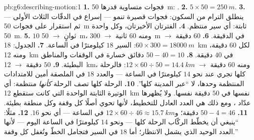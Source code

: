 \begin{solution}{pb:g6:describing-motion:1}
\textbf{1.} فجوات متساوية قدرها \qty{50}{m}: .
\textbf{2.} $5 \times 50 = \qty{250}{m}$.
\textbf{3.} ينطلق الترام من السكون: فجوات قصيرة تنمو ---
إسراع في الدقّات الثلاث الأولى --- ثم استقرار على فجوات
\qty{50}{m} ثابتة: أي سير منتظم.
\textbf{4.} الفترتان الأخيرتان، وكل واحدة \qty{50}{m}.
\textbf{5.} $10$ ثوانٍ $\to$ \qty{50}{m}، ومنه $60$ ثانية $\to$
\qty{300}{m} في الدقيقة.
\textbf{6.} $60$ دقيقة $\to$ $60 \times 300 = \qty{18000}{m}$:
 السير $18$ كيلومترًا في الساعة.
\textbf{7.} الجدول: \qty{18}{km} لكل $60$ دقيقة، ومنه \qty{12}{km}
في $40$ دقيقة.
\textbf{8.} $50 - 40 = 10$ دقائق خسارة في الوقفات والمناطق
البطيئة.
\textbf{9.} $50$ دقيقة $\to$ \qty{12}{km}، ومنه $60$ دقيقة $\to$
$12 \times 60 \div 50 = \qty{14.4}{km}$: فالرحلة كلها تجري عند
نحو $14$ كيلومترًا في الساعة --- والعدد $18$ في الملصقة أمين
للامتدادات المنتظمة وحدها، لا ``عبر المدينة كلها''.
\textbf{10.}  الرحلة كلها تصف الرحلة \emph{كأنها} منتظمة:
أي الوتيرة الثابتة الواحدة التي كانت ستقطع \qty{12}{km} نفسها في
$50$ دقيقة نفسها. ولا يُظهرها عدّاد ، ومع ذلك هي العدد
العادل للتخطيط، لأنها تحوي أصلًا كل وقفة وكل منطقة بطيئة.
\textbf{11.} $50 - 4 = 46$ دقيقة؛ و$12 \times 60 \div 46 \approx
\qty{15.7}{km}$ في الساعة --- أي نحو $16$.
\textbf{12.} مثلًا: ``ينبغي أن يخطّط الركّاب  الرحلة كلها
--- ونحو $14$ كيلومترًا في الساعة اليوم --- لأنها العدد الوحيد
الذي يشمل الانتظار؛ أما $18$ في السير فتجامل الخطّ وتُغفل كل
وقفة.''
\end{solution}
